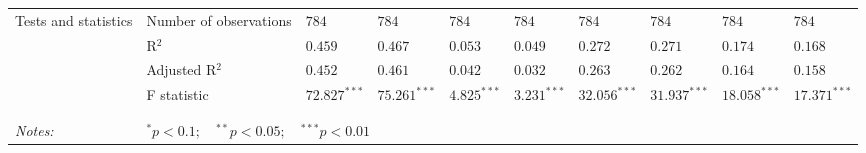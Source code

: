 \documentclass[10pt, letterpaper, landscape]{amsart}
\begin{document}
\begin{table}[!ht]
\begin{tabular}{@{}llllllllll@{}}
		\addlinespace[0.5em]
		\addlinespace[1.3em]\addlinespace[-1.3em]\midrule\addlinespace[0.5em] Tests and statistics
			 & Number of observations
			 & $784$
			 & $784$
			 & $784$
			 & $784$
			 & $784$
			 & $784$
			 & $784$
			 & $784$\\
	
		\addlinespace[0.5em]
			 & R$^2$
			 & $0.459$
			 & $0.467$
			 & $0.053$
			 & $0.049$
			 & $0.272$
			 & $0.271$
			 & $0.174$
			 & $0.168$\\
	
		\addlinespace[0.5em]
			 & Adjusted R$^2$
			 & $0.452$
			 & $0.461$
			 & $0.042$
			 & $0.032$
			 & $0.263$
			 & $0.262$
			 & $0.164$
			 & $0.158$\\
	
		\addlinespace[0.5em]
			 & F statistic
			 & $72.827^{ *** }$
			 & $75.261^{ ***}$
			 & $4.825^{ *** }$
			 & $3.231^{ *** }$
			 & $32.056^{ ***}$
			 & $31.937^{ ***}$
			 & $18.058^{ ***}$
			 & $17.371^{ ***}$

\\ \midrule\\[-2.8ex]\bottomrule
		\\ 
		\emph{Notes:} & \multicolumn{9}{l}{${}^{*}p<0.1; \quad {}^{**}p<0.05;  \quad {}^{***}p<0.01 $ } \\ 
		\end{tabular}
	\end{table}
\end{document}
